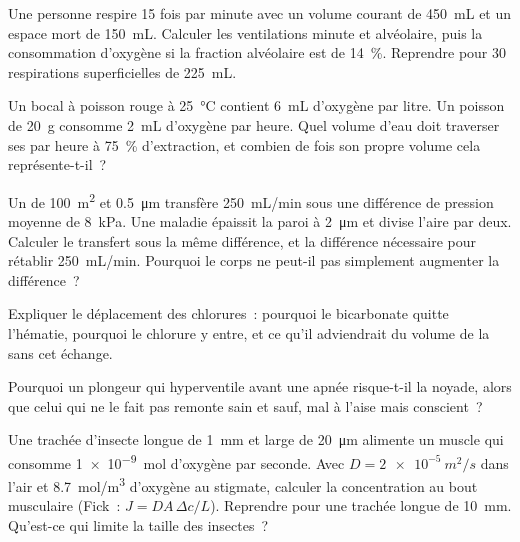 \begin{exercise}[$\star\star$]\label{exo:b1:gas-exchange:5}
Une personne respire \qty{15}{} fois par minute avec un volume courant
de \qty{450}{mL} et un espace mort de \qty{150}{mL}. Calculer les
ventilations minute et alvéolaire, puis la consommation d'oxygène si
la fraction alvéolaire est de \qty{14}{\%}. Reprendre pour \qty{30}{}
respirations superficielles de \qty{225}{mL}.
\end{exercise}

\begin{exercise}[$\star\star$]\label{exo:b1:gas-exchange:6}
Un bocal à poisson rouge à \qty{25}{\celsius} contient \qty{6}{mL}
d'oxygène par litre. Un poisson de \qty{20}{g} consomme \qty{2}{mL}
d'oxygène par heure. Quel volume d'eau doit traverser ses 
par heure à \qty{75}{\%} d'extraction, et combien de fois son propre
volume cela représente-t-il~?
\end{exercise}

\begin{exercise}[$\star\star$]\label{exo:b1:gas-exchange:7}
Un  de \qty{100}{m^2} et \qty{0.5}{\micro m} transfère
\qty{250}{mL/min} sous une différence de pression moyenne de
\qty{8}{kPa}. Une maladie épaissit la paroi à \qty{2}{\micro m} et
divise l'aire par deux. Calculer le transfert sous la même différence,
et la différence nécessaire pour rétablir \qty{250}{mL/min}. Pourquoi
le corps ne peut-il pas simplement augmenter la différence~?
\end{exercise}

\begin{exercise}[$\star\star$]\label{exo:b1:gas-exchange:8}
Expliquer le déplacement des chlorures~: pourquoi le bicarbonate quitte
l'hématie, pourquoi le chlorure y entre, et ce qu'il adviendrait du
volume de la  sans cet échange.
\end{exercise}

\begin{exercise}[$\star\star$]\label{exo:b1:gas-exchange:9}
Pourquoi un plongeur qui hyperventile avant une apnée risque-t-il la
noyade, alors que celui qui ne le fait pas remonte sain et sauf, mal à
l'aise mais conscient~?
\end{exercise}

\begin{exercise}[$\star\star\star$]\label{exo:b1:gas-exchange:10}
Une trachée d'insecte longue de \qty{1}{mm} et large de
\qty{20}{\micro m} alimente un muscle qui consomme \qty{1e-9}{mol}
d'oxygène par seconde. Avec $D = \qty{2e-5}{m^2/s}$ dans l'air et
\qty{8.7}{mol/m^3} d'oxygène au stigmate, calculer la concentration au
bout musculaire (Fick~: $J = DA\,\Delta c/L$). Reprendre pour une
trachée longue de \qty{10}{mm}. Qu'est-ce qui limite la taille des
insectes~?
\end{exercise}

